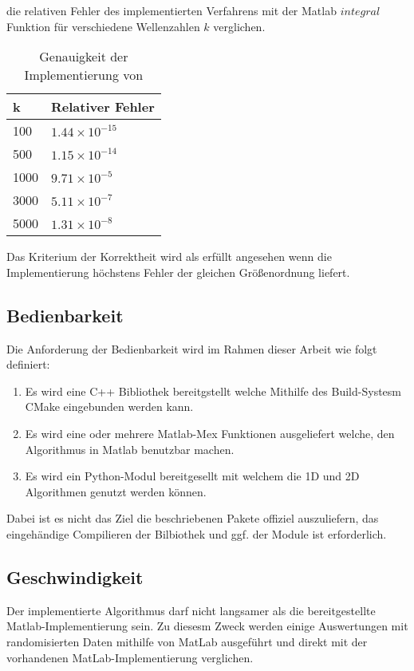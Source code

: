 die relativen Fehler des implementierten Verfahrens mit der Matlab $integral$ Funktion für verschiedene Wellenzahlen $k$ verglichen.
\begin{table}[ht]
    \centering
    \begin{tabular}{|l|l|}
    \hline
    k & Relativer Fehler \\ 
    \hline \hline
    100  & $1.44 × 10^{-15}$ \\
    500  &  $1.15 × 10^{-14}$ \\
    1000 &  $9.71 × 10^{-5}$ \\
    3000 &  $5.11 × 10^{-7}$ \\
    5000 & $1.31 × 10^{-8}$ \\  \hline
    \end{tabular}    
    \caption{Genauigkeit der Implementierung von \cite*[]{gasperini:hal-03209144}}
\end{table} 
Das Kriterium der Korrektheit wird als erfüllt angesehen wenn die Implementierung höchstens Fehler der gleichen Größenordnung liefert.

\pagebreak

\subsection{Bedienbarkeit}

Die Anforderung der Bedienbarkeit wird im Rahmen dieser Arbeit wie folgt definiert:

\begin{enumerate}
    \item Es wird eine C++ Bibliothek bereitgstellt welche Mithilfe des Build-Systesm CMake eingebunden werden kann. 
    \item Es wird eine oder mehrere Matlab-Mex Funktionen ausgeliefert welche, den Algorithmus in Matlab benutzbar machen. 
    \item Es wird ein Python-Modul bereitgesellt mit welchem die 1D und 2D Algorithmen genutzt werden können.
\end{enumerate}

Dabei ist es nicht das Ziel die beschriebenen Pakete offiziel auszuliefern, das eingehändige Compilieren der Bilbiothek und ggf. der Module ist erforderlich.

\subsection{Geschwindigkeit}\label{Performance}


Der implementierte Algorithmus darf nicht langsamer als die bereitgestellte Matlab-Implementierung sein.
Zu diesesm Zweck werden einige Auswertungen mit randomisierten Daten mithilfe von MatLab ausgeführt und direkt mit der vorhandenen MatLab-Implementierung verglichen.



